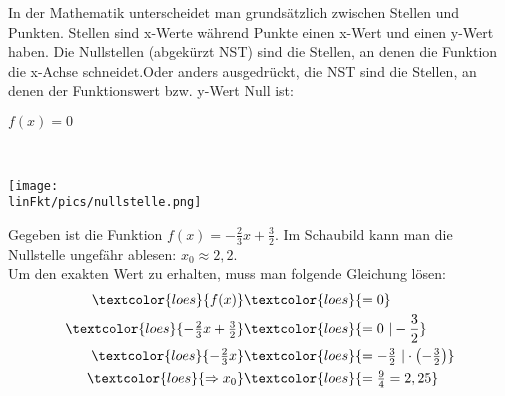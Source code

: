 In der Mathematik unterscheidet man grundsätzlich zwischen Stellen und Punkten. Stellen sind x-Werte während Punkte einen x-Wert und einen y-Wert haben. Die Nullstellen (abgekürzt NST) sind die Stellen, an denen die Funktion die x-Achse schneidet.Oder anders ausgedrückt, die NST sind die Stellen, an denen der Funktionswert bzw. y-Wert Null ist:
\begin{tcolorbox}
	\centering
	\textcolor{loestc}{$f(x)=0$}
\end{tcolorbox}
\begin{bsp}\phantom{A}\vspace{0.2cm}\\
	\begin{minipage}{0.55\textwidth}
		\texttt{[image: \\linFkt/pics/nullstelle.png]}
	\end{minipage}
	\begin{minipage}{0.45\textwidth}
		Gegeben ist die Funktion $f(x)=-\tfrac{2}{3}x+\tfrac{3}{2}$.
		Im Schaubild kann man die Nullstelle ungefähr ablesen: $x_0\approx 2,2$.\\
		Um den exakten Wert zu erhalten, muss man folgende Gleichung lösen:
		\begin{align*}
			\textcolor{loes}{f(x)}&\textcolor{loes}{=0}\\
			\textcolor{loes}{-\tfrac{2}{3}x+\tfrac{3}{2}}&\textcolor{loes}{=0\ \vert-\dfrac{3}{2}}\\
			\textcolor{loes}{-\tfrac{2}{3}x}&\textcolor{loes}{=-\tfrac{3}{2}\ \vert\cdot\left(-\tfrac{3}{2}\right)}\\
			\textcolor{loes}{\Rightarrow x_0}&\textcolor{loes}{=\tfrac{9}{4}=2,25}
		\end{align*}
	\end{minipage}
\end{bsp}

